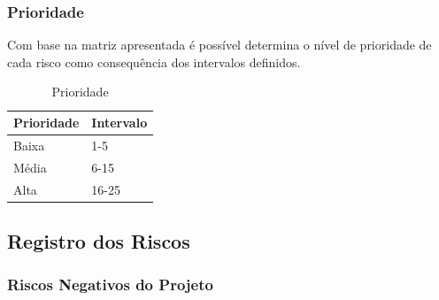 \subsubsection{Prioridade}
Com base na matriz apresentada é possível determina o nível de prioridade de cada risco como consequência dos intervalos definidos.

\begin{table}[ht]
\centering
\caption{Prioridade}
\label{prioridade}
\begin{tabular}{|l|l|}
\hline
Prioridade & Intervalo \\ 
\hline
Baixa      & 1-5       \\ 
Média      & 6-15      \\ 
Alta       & 16-25     \\ 
\hline
\end{tabular}
\end{table}

\subsection{Registro dos Riscos}

\subsubsection{Riscos Negativos do Projeto}


